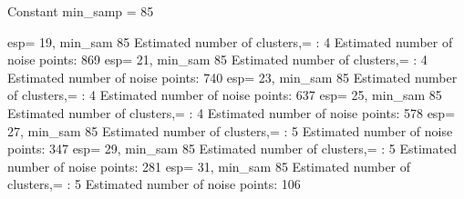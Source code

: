 
Constant min_samp = 85

esp= 19, min_sam 85
Estimated number of clusters,= : 4
Estimated number of noise points: 869
esp= 21, min_sam 85
Estimated number of clusters,= : 4
Estimated number of noise points: 740
esp= 23, min_sam 85
Estimated number of clusters,= : 4
Estimated number of noise points: 637
esp= 25, min_sam 85
Estimated number of clusters,= : 4
Estimated number of noise points: 578
esp= 27, min_sam 85
Estimated number of clusters,= : 5
Estimated number of noise points: 347
esp= 29, min_sam 85
Estimated number of clusters,= : 5
Estimated number of noise points: 281
esp= 31, min_sam 85
Estimated number of clusters,= : 5
Estimated number of noise points: 106